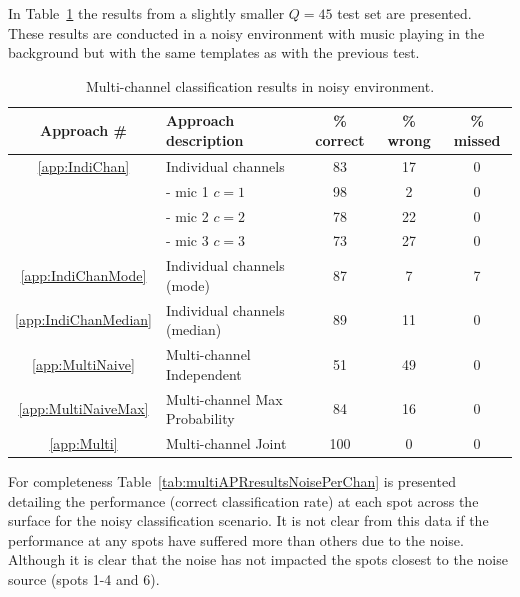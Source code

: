 In Table~\ref{tab:multiAPRresultsNoise} the results from a slightly smaller $Q=45$ test set are presented. These results are conducted in a noisy environment with music playing in the background but with the same templates as with the previous test.

\begin{table}\begin{center}
\caption{Multi-channel classification results in noisy environment.}
\label{tab:multiAPRresultsNoise}
\begin{tabular}{|c|l|c|c|c|}\hline
Approach \#             & Approach description          & \% correct    & \% wrong  & \%  missed  \\ \hline
\ref{app:IndiChan}      & Individual channels           & 83            & 17        & 0           \\
                        &  - mic 1 $c = 1$              & 98            & 2         & 0           \\
                        &  - mic 2 $c = 2$              & 78            & 22        & 0           \\
                        &  - mic 3 $c = 3$              & 73            & 27        & 0           \\
\ref{app:IndiChanMode}  & Individual channels (mode)    & 87            & 7         & 7           \\
\ref{app:IndiChanMedian}& Individual channels (median)  & 89            & 11        & 0           \\
\ref{app:MultiNaive}    & Multi-channel Independent     & 51            & 49        & 0           \\
\ref{app:MultiNaiveMax} & Multi-channel Max Probability & 84            & 16        & 0           \\
\ref{app:Multi}         & Multi-channel Joint           & 100           & 0         & 0           \\ \hline
\end{tabular}\end{center}\end{table}

For completeness Table~\ref{tab:multiAPRresultsNoisePerChan} is presented detailing the performance (correct classification rate) at each spot across the surface for the noisy classification scenario. It is not clear from this data if the performance at any spots have suffered more than others due to the noise. Although it is clear that the noise has not impacted the spots closest to the noise source (spots 1-4 and 6).

